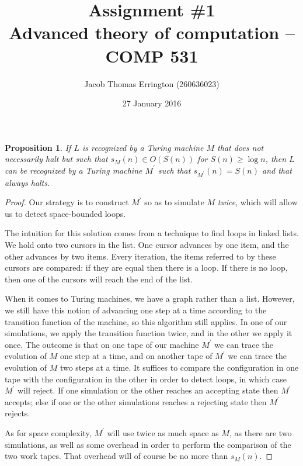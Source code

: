 \documentclass[11pt,letterpaper]{article}
\author{Jacob Thomas Errington (260636023)}
\title{Assignment \#1\\Advanced theory of computation -- COMP 531}
\date{27 January 2016}
\newtheorem{proposition}{Proposition}
\begin{document}
\maketitle

\begin{proposition}
    If $L$ is recognized by a Turing machine $M$ that does not necessarily halt
    but such that $s_M(n) \in O(S(n))$ for $S(n) \geq \log n$, then $L$ can be
    recognized by a Turing machine $M^\prime$ such that
    $s_{M^\prime}(n) = S(n)$ and that always halts.
\end{proposition}

\begin{proof}
    Our strategy is to construct $M^\prime$ so as to simulate $M$ \emph{twice},
    which will allow us to detect space-bounded loops.

    The intuition for this solution comes from a technique to find loops in
    linked lists. We hold onto two cursors in the list. One cursor advances by
    one item, and the other advances by two items. Every iteration, the items
    referred to by these cursors are compared: if they are equal then there is
    a loop. If there is no loop, then one of the cursors will reach the end of
    the list.

    When it comes to Turing machines, we have a graph rather than a list.
    However, we still have this notion of advancing one step at a time
    according to the transition function of the machine, so this algorithm
    still applies. In one of our simulations, we apply the transition function
    twice, and in the other we apply it once. The outcome is that on one tape
    of our machine $M^\prime$ we can trace the evolution of $M$ one step at a
    time, and on another tape of $M^\prime$ we can trace the evolution of $M$
    two steps at a time. It suffices to compare the configuration in one tape
    with the configuration in the other in order to detect loops, in which case
    $M^\prime$ will reject. If one simulation or the other reaches an accepting
    state then $M^\prime$ accepts; else if one or the other simulations reaches
    a rejecting state then $M^\prime$ rejects.

    As for space complexity, $M^\prime$ will use twice as much space as $M$, as
    there are two simulations, as well as some overhead in order to perform the
    comparison of the two work tapes. That overhead will of course be no more
    than $s_M(n)$.
\end{proof}
\end{document}
